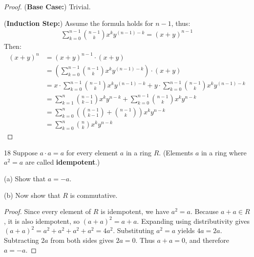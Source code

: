 \begin{proof}
    (\textbf{Base Case:}) Trivial.

    (\textbf{Induction Step:}) Assume the formula holds for $n - 1$, thus:
    \begin{align*}
        \sum_{k = 0}^{n - 1} \binom{n - 1}{k} x^k y^{(n-1)-k} = (x+y)^{n - 1}
    \end{align*}
    Then:
    \begin{align*}
        {(x+y)}^n & = {(x+y)}^{n - 1} \cdot (x + y)                                                                                              \\
                  & = \left(\sum_{k = 0}^{n - 1} \binom{n - 1}{k} x^k y^{(n-1)-k}\right) \cdot (x + y)                                              \\
                  & = x \cdot \sum_{k = 0}^{n - 1} \binom{n - 1}{k} x^k y^{(n-1)-k} + y \cdot \sum_{k = 0}^{n - 1} \binom{n - 1}{k} x^k y^{(n-1)-k} \\
                  & = \sum_{k = 1}^{n} \binom{n - 1}{k - 1} x^k y^{n - k} + \sum_{k = 0}^{n - 1} \binom{n - 1}{k} x^k y^{n - k}                     \\
                  & = \sum_{k = 0}^{n} \left( \binom{n - 1}{k - 1} + \binom{n - 1}{k} \right) x^k y^{n - k}                                         \\
                  & = \sum_{k = 0}^{n} \binom{n}{k} x^k y^{n - k}
    \end{align*}
\end{proof}

\begin{problem}{18}
    Suppose $a \cdot a = a$ for every element $a$ in a ring $R$.
    (Elements $a$ in a ring where $a^2 = a$ are called \textbf{idempotent}.)

    (a) Show that $a = -a$.

    (b) Now show that $R$ is commutative.
\end{problem}
\solved

\begin{proof}
    Since every element of $R$ is idempotent, we have $a^2 = a$.
    Because $a + a \in R$, it is also idempotent, so $(a + a)^2 = a + a$.
    Expanding using distributivity gives $(a + a)^2 = a^2 + a^2 + a^2 + a^2 = 4a^2$.
    Substituting $a^2 = a$ yields $4a = 2a$.
    Subtracting $2a$ from both sides gives $2a = 0$.
    Thus $a + a = 0$, and therefore $a = -a$.
\end{proof}


